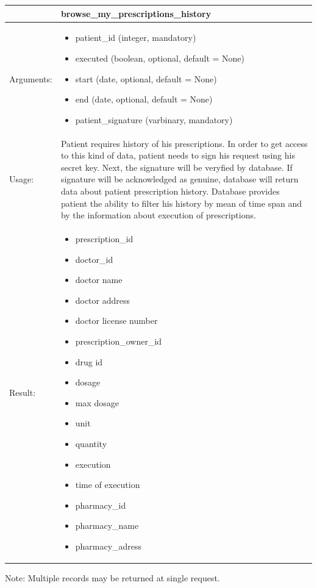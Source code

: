 \begin{table}[h]
    \begin{tabular}{| p{6cm} | p{7.75cm} |}
    \hline
     & browse\_my\_prescriptions\_history \\ \hline
    Arguments: &  \begin{itemize}
    	\item patient\_id (integer, mandatory)
		\item executed (boolean, optional, default = None)
		\item start (date, optional, default = None)
		\item end (date, optional, default = None)
		\item patient\_signature (varbinary, mandatory)
	\end{itemize}     \\ \hline
    Usage: & Patient requires history of his prescriptions. In order to get access to this kind of data, patient needs to sign his request using his secret key. Next, the signature will be veryfied by database. If signature will be acknowledged as genuine, database will return data about patient prescription history. Database provides patient the ability to filter his history by mean of time span and by the information about execution of prescriptions. \\ \hline
    Result: & \begin{itemize}
    	\item prescription\_id
    	\item doctor\_id
    	\item doctor name
    	\item doctor address
    	\item doctor license number
    	\item prescription\_owner\_id
    	\item drug id
    	\item dosage
    	\item max dosage
    	\item unit
    	\item quantity
    	\item execution
    	\item time of execution
    	\item pharmacy\_id
    	\item pharmacy\_name
    	\item pharmacy\_adress
	\end{itemize}     \\ \hline	
    \end{tabular}
\end{table}Note: Multiple records may be returned at single request.

